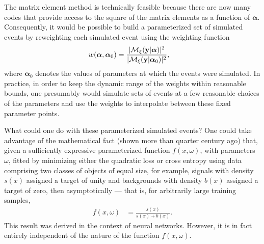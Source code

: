 The matrix element method is technically feasible because there are now many codes that provide access to the square of the matrix elements as a function of ${\boldsymbol\alpha}$. Consequently, it would be possible to build a parameterized set of simulated events by reweighting each simulated event using the weighting function
\begin{align}
 w(\boldsymbol{\alpha}, \boldsymbol{\alpha}_0) & = \frac{|\mathcal{M}_{\xi}({\bf y}|\boldsymbol\alpha)|^2}{|\mathcal{M}_{\xi}({\bf y}|\boldsymbol\alpha_0)|^2},
\end{align}
where $\boldsymbol{\alpha}_0$ denotes the values of parameters at which the events were simulated. In practice, in order to keep the dynamic range of the weights within reasonable bounds, one presumably would simulate sets of events at a few reasonable choices of the parameters and use the weights to interpolate between these fixed parameter points.

What could one do with these parameterized simulated events? One could take advantage of the mathematical fact (shown more than quarter century ago) that, given a sufficiently expressive parameterized function $f(x, \omega)$, with parameters $\omega$, fitted by minimizing either the quadratic loss or cross entropy using data comprising two classes of objects of equal size, for example, signals with density $s(x)$ assigned a target of unity and backgrounds with density $b(x)$ assigned a target of zero, then asymptotically --- that is, for arbitrarily large training samples,
\begin{align}
 f(x, \omega) & = \frac{s(x)}{s(x) + b(x)}.
 \label{eqn:discriminant}
\end{align}
This result was derived in the context of neural networks. However, it is in fact entirely independent of the nature of the function
$f(x, \omega)$.

